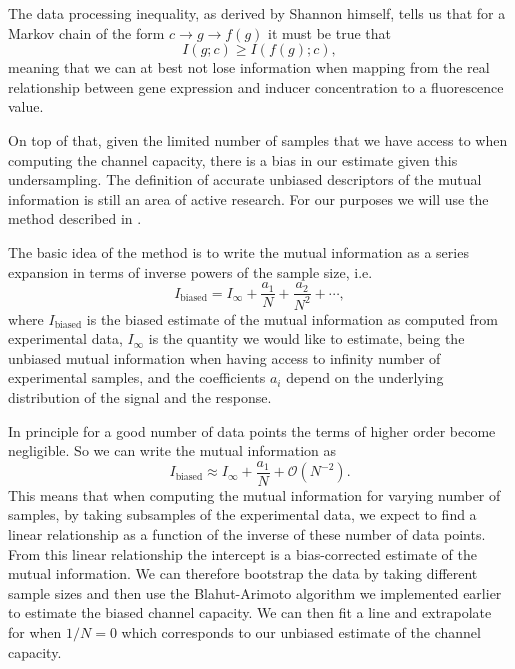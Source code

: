 The data processing inequality, as derived by Shannon himself, tells us that
for a Markov chain of the form $c \rightarrow g \rightarrow f(g)$ it must be
true that \cite{Shannon1948}
\begin{equation}
I(g; c) \geq I(f(g); c),
\end{equation}
meaning that we can at best not lose information when mapping from the real
relationship between gene expression and inducer concentration to a fluorescence
value.

On top of that, given the limited number of samples that we have access to when
computing the channel capacity, there is a bias in our estimate given this
undersampling. The definition of accurate unbiased descriptors of the mutual
information is still an area of active research. For our purposes we will use
the method described in \cite{Cheong2011a}.

The basic idea of the method is to write the mutual information as a series
expansion in terms of inverse powers of the sample size, i.e.
\begin{equation}
I_{\text{biased}} = I_\infty + \frac{a_1}{N} + \frac{a_2}{N^2} + \cdots,
\end{equation}
where $I_{\text{biased}}$ is the biased estimate of the mutual information as
computed from experimental data, $I_\infty$ is the quantity we would like to
estimate, being the unbiased mutual information when having access to infinity
number of experimental samples, and the coefficients $a_i$ depend on the
underlying distribution of the signal and the response.

In principle for a good number of data points the terms of higher order become
negligible. So we can write the mutual information as
\begin{equation}
I_{\text{biased}} \approx I_\infty + \frac{a_1}{N} + \mathcal{O}(N^{-2}).
\label{seq_mutual_biased}
\end{equation}
This means that when computing the mutual information for varying number of
samples, by taking subsamples of the experimental data, we expect to find a
linear relationship as a function of the inverse of these number of data points.
From this linear relationship the intercept is a bias-corrected estimate of the
mutual information. We can therefore bootstrap the data by taking different
sample sizes and then use the Blahut-Arimoto algorithm we implemented earlier to
estimate the biased channel capacity. We can then fit a line and extrapolate for
when $1/N = 0$ which corresponds to our unbiased estimate of the channel
capacity.

